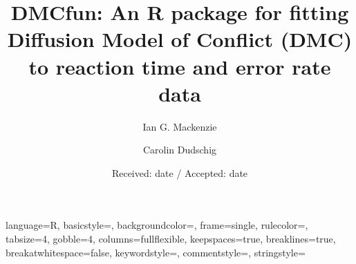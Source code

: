\newenvironment{knitrout}{}{} %

\usepackage{alltt}  %

\usepackage{times}  %
\usepackage{graphicx}
\usepackage{color}
\usepackage{float}
\usepackage{amsmath}
\usepackage{listings}
\usepackage{longtable}
\usepackage[style=apa, sortcites=true, sorting=nyt,backend=biber]{biblatex}





{
  language=R,
  basicstyle=\small\ttfamily,
  backgroundcolor=\color{white},
  frame=single,
  rulecolor=\color{black},
  tabsize=4,
  gobble=4,
  columns=fullflexible,
  keepspaces=true,
  breaklines=true,
  breakatwhitespace=false,
  keywordstyle=\color{black},
  commentstyle=\color{dkgreen},
  stringstyle=\color{black}
}


\title{DMCfun: An R package for fitting Diffusion Model of Conflict (DMC) to reaction time and error rate data}
\subtitle{}

\author{Ian G. Mackenzie \and
    Carolin Dudschig
}


\date{Received: date / Accepted: date}
\maketitle

